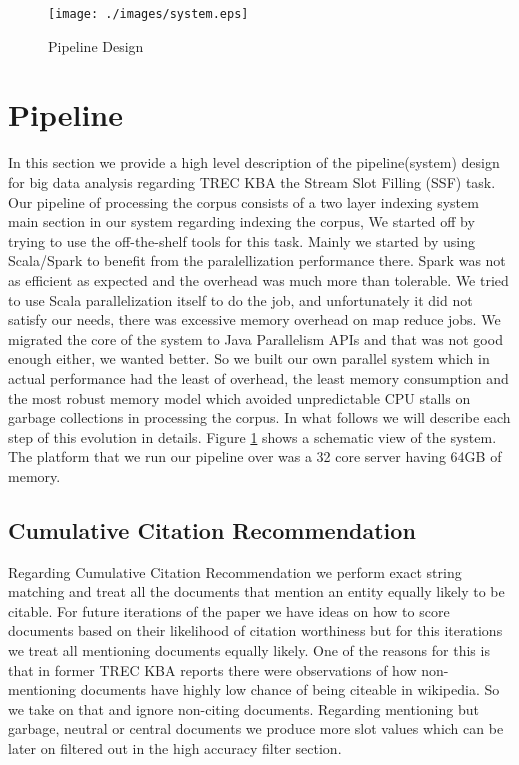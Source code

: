 
\begin{figure}[b]
\centering
\texttt{[image: ./images/system.eps]}
\vspace*{-.1in} \caption{Pipeline Design }\label{fig:system}
\vspace*{-.2in}
\end{figure}

\section{Pipeline}

In this section we provide a high level description of the pipeline(system) design for big data analysis regarding TREC KBA the Stream Slot Filling (SSF) task. Our pipeline of processing the corpus consists of a two layer indexing system main section in our system regarding indexing the corpus, We started off by trying to use the off-the-shelf tools for this task. Mainly we started by using Scala/Spark\cite{ferc11} to benefit from the paralellization performance there.  Spark was not as efficient as expected and the overhead was much more than tolerable. We tried to use Scala parallelization itself to do the job, and unfortunately it did not satisfy our needs, there was excessive memory overhead on map reduce jobs. We migrated the core of the system to Java Parallelism APIs and that was not good enough either, we wanted better. So we built our own parallel system which in actual performance had the least of overhead, the least memory consumption and the most robust memory model which avoided unpredictable CPU stalls on garbage collections in processing the corpus. In what follows we will describe each step of this evolution in details. Figure \ref{fig:system} shows a schematic view of the system. The platform that we run our pipeline over was a 32 core server having 64GB of memory.





\subsection{Cumulative Citation Recommendation}

Regarding Cumulative Citation Recommendation we perform exact string matching and treat all the documents that mention an entity equally likely to be citable. For future iterations of the paper we have ideas on how to score documents based on their likelihood of citation worthiness but for this iterations we treat all mentioning documents equally likely. One of the reasons for this is that in former TREC KBA reports \cite{JFrank12} there were observations of how non-mentioning documents have highly low chance of being citeable in wikipedia. So we take on that and ignore non-citing documents. Regarding mentioning but garbage, neutral or central documents we produce more slot values which can be later on filtered out in the high accuracy filter section.

